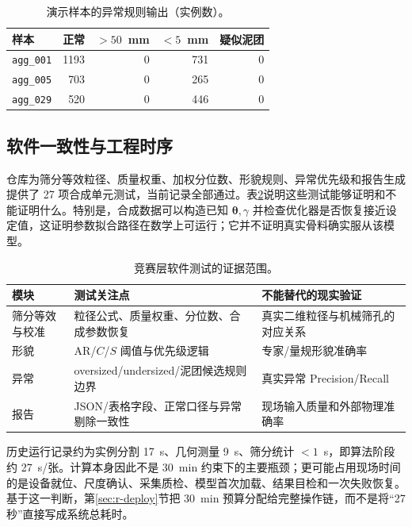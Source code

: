 \begin{table}[t]
\centering
\caption{演示样本的异常规则输出（实例数）。}
\label{tab:r-anomaly-results}
\footnotesize
\begin{tabular}{lrrrr}
\toprule
样本 & 正常 & $>50$~mm & $<5$~mm & 疑似泥团 \\
\midrule
\texttt{agg\_001} & 1193 & 0 & 731 & 0 \\
\texttt{agg\_005} & 703 & 0 & 265 & 0 \\
\texttt{agg\_029} & 520 & 0 & 446 & 0 \\
\bottomrule
\end{tabular}
\end{table}

\subsection{软件一致性与工程时序}

仓库为筛分等效粒径、质量权重、加权分位数、形貌规则、异常优先级和报告生成提供了 27 项合成单元测试，当前记录全部通过。表\ref{tab:r-software-tests}说明这些测试能够证明和不能证明什么。特别是，合成数据可以构造已知 $\boldsymbol{\theta},\gamma$ 并检查优化器是否恢复接近设定值，这证明参数拟合路径在数学上可运行；它并不证明真实骨料确实服从该模型。

\begin{table}[t]
\centering
\caption{竞赛层软件测试的证据范围。}
\label{tab:r-software-tests}
\footnotesize
\renewcommand{\arraystretch}{1.12}
\begin{tabular}{>{\raggedright\arraybackslash}p{3.2cm}>{\raggedright\arraybackslash}p{5.0cm}>{\raggedright\arraybackslash}p{5.2cm}}
\toprule
模块 & 测试关注点 & 不能替代的现实验证 \\
\midrule
筛分等效与校准 & 粒径公式、质量权重、分位数、合成参数恢复 & 真实二维粒径与机械筛孔的对应关系 \\
形貌 & AR/$C$/$S$ 阈值与优先级逻辑 & 专家/量规形貌准确率 \\
异常 & oversized/undersized/泥团候选规则边界 & 真实异常 Precision/Recall \\
报告 & JSON/表格字段、正常口径与异常剔除一致性 & 现场输入质量和外部物理准确率 \\
\bottomrule
\end{tabular}
\end{table}

历史运行记录约为实例分割 17~s、几何测量 9~s、筛分统计 $<1$~s，即算法阶段约 27~s/张。计算本身因此不是 30~min 约束下的主要瓶颈；更可能占用现场时间的是设备就位、尺度确认、采集质检、模型首次加载、结果目检和一次失败恢复。基于这一判断，第\ref{sec:r-deploy}节把 30~min 预算分配给完整操作链，而不是将“27 秒”直接写成系统总耗时。

